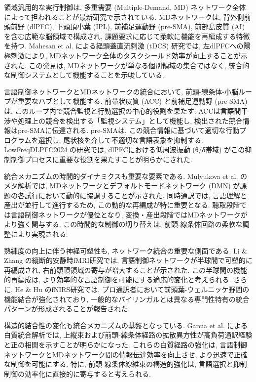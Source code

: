領域汎用的な実行制御は, 多重需要 (Multiple-Demand, MD) ネットワーク全体によって担われることが最新研究で示されている.
MDネットワークは, 背外側前頭前野 (dlPFC), 下頭頂小葉 (IPL), 前補足運動野 (pre-SMA), 前部島皮質 (AI) を含む広範な脳領域で構成され, 課題要求に応じて柔軟に機能を再編成する特徴を持つ.
Mahesan et al. \cite{Mahesan2023} による経頭蓋直流刺激 (tDCS) 研究では, 左dlPFCへの陽極刺激により, MDネットワーク全体のタスクシールド効率が向上することが示された.
この発見は, MDネットワークが単なる個別領域の集合ではなく, 統合的な制御システムとして機能することを示唆している.

言語制御ネットワークとMDネットワークの統合において, 前頭-線条体-小脳ループが重要なハブとして機能する.
前帯状皮質 (ACC) と前補足運動野 (pre-SMA) は, このループ内で競合監視と行動選択の中心的役割を果たす.
ACCは言語間干渉や処理上の競合を検出する「監視システム」として機能し, 検出された競合情報はpre-SMAに伝達される.
pre-SMAは, この競合情報に基づいて適切な行動プログラムを選択し, 尾状核を介して不適切な言語表象を抑制する.
LowFreqDLPFC2024 \cite{LowFreqDLPFC2024} の研究では, dlPFCにおける低周波振動 (θ/δ帯域) がこの抑制制御プロセスに重要な役割を果たすことが明らかにされた.

統合メカニズムの時間的ダイナミクスも重要な要素である.
Mulyukova et al. \cite{MDN_DMN2023} のメタ解析では, MDネットワークとデフォルトモードネットワーク (DMN) が課題の各試行において動的に協調することが示された.
同時通訳では, 言語理解と産出が並行して進行するため, この動的な再編成が特に重要となる.
聴取段階では言語制御ネットワークが優位となり, 変換・産出段階ではMDネットワークがより強く関与する.
この時間的な制御の切り替えは, 前頭-線条体回路の柔軟な調整により実現される.

熟練度の向上に伴う神経可塑性も, ネットワーク統合の重要な側面である.
Li \& Zhang \cite{Li2025} の縦断的安静時fMRI研究では, 言語制御ネットワークが半球間で可塑的に再編成され, 右前頭頂領域の寄与が増大することが示された.
この半球間の機能的再編成は, より効率的な言語制御を可能にする適応的変化と考えられる.
さらに, He \& Hu \cite{He2022} のfNIRS研究では, プロ通訳者において前頭葉-ウェルニッケ野間の機能結合が強化されており, 一般的なバイリンガルとは異なる専門性特有の統合パターンが形成されることが報告された.

構造的結合性の変化も統合メカニズムの基盤となっている.
Garcia et al. \cite{WhiteMatter2024} による白質統合解析では, 上縦束および前頭-線条体経路の拡散異方性が高負荷通訳経験と正の相関を示すことが明らかになった.
これらの白質経路の強化は, 言語制御ネットワークとMDネットワーク間の情報伝達効率を向上させ, より迅速で正確な制御を可能にする.
特に, 前頭-線条体線維束の構造的強化は, 言語選択と抑制制御の効率化に直接的に寄与すると考えられる.

